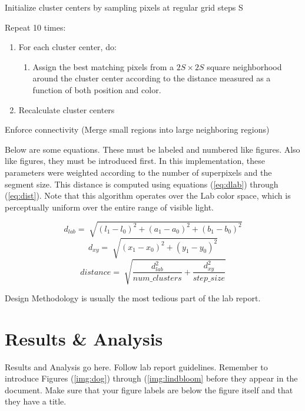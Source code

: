 \documentclass[CMPE]{KGCOEReport}
\begin{document}
\begin{enumerate}
\item{Initialize cluster centers by sampling pixels at regular grid steps S}
\item{Repeat 10 times:
	\begin{enumerate}
    	\item{For each cluster center, do:
        	\begin{enumerate}
            	\item{Assign the best matching pixels from a ${2S}\times{2S}$ square neighborhood around the cluster center according to the distance measured as a function of both position and color.}
            \end{enumerate}
        }
        \item{Recalculate cluster centers}
    \end{enumerate}
    
    \item{Enforce connectivity (Merge small regions into large neighboring regions)}
}
\end{enumerate}

Below are some equations. These must be labeled and numbered like figures. Also like figures, they must be introduced first. In this implementation, these parameters were weighted according to the number of superpixels and the segment size. This distance is computed using equations (\ref{eq:dlab}) through (\ref{eq:dist}). Note that this algorithm operates over the Lab color space, which is perceptually uniform over the entire range of visible light.

\begin{equation}\label{eq:dlab}
d_{lab} = \sqrt[]{(l_1 - l_0)^2 + (a_1 - a_0)^2 + (b_1 - b_0)^2}
\end{equation}
\begin{equation}\label{eq:dxy}
d_{xy} = \sqrt[]{(x_1 - x_0)^2 + (y_1 - y_0)^2}
\end{equation}
\begin{equation}\label{eq:dist}
distance = \sqrt[]{\frac{d_{lab}^2}{num\_clusters} + \frac{d_{xy}^2}{step\_size}}
\end{equation}

Design Methodology is usually the most tedious part of the lab report.\\


\section{Results \& Analysis}
Results and Analysis go here. Follow lab report guidelines. Remember to introduce Figures (\ref{img:dog}) through (\ref{img:lindbloom} before they appear in the document. Make sure that your figure labels are below the figure itself and that they have a title.
\end{document}
